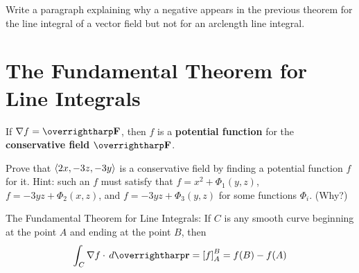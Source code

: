 \documentclass[letterpaper, twoside, 12pt]{book}
\begin{document}
          \begin{problem}
            Write a paragraph explaining why a negative appears in the
            previous theorem for the
            line integral of a vector field but not for an arclength
            line integral.
          \end{problem}

          \begin{solution}

          \end{solution}

          \begin{contributors}

          \end{contributors}


\section{The Fundamental Theorem for Line Integrals} %

\begin{definition}
  If $\nabla f=\vect{F}$, then $f$ is a \textbf{potential function}
  for the \textbf{conservative field} $\vect{F}$.
\end{definition}

          \begin{problem} %
            Prove that $\langle2x,-3z,-3y\rangle$ is a conservative field by
            finding a potential function $f$ for it. Hint: such an $f$
            must satisfy that $f=x^2+\Phi_1(y,z)$, $f=-3yz+\Phi_2(x,z)$,
            and $f=-3yz+\Phi_3(y,z)$ for some functions $\Phi_i$. (Why?)
          \end{problem}

          \begin{solution}

          \end{solution}

          \begin{contributors}

          \end{contributors}

\begin{theorem}
  The Fundamental Theorem for Line Integrals:
  If $C$ is any smooth curve beginning at the point $A$ and ending at the
  point $B$, then
  \[
    \int_C \nabla f\cdot \dvar{\vect{r}} = \left[f\right]_A^B = f(B)-f(A)
  \]
\end{theorem}
\end{document}
